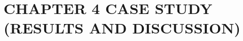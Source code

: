 \chapter[CASE STUDY (RESULTS AND DISCUSSION)]{\hfill CHAPTER 4 \hfill\null\vskip15pt CASE STUDY (RESULTS AND DISCUSSION)}